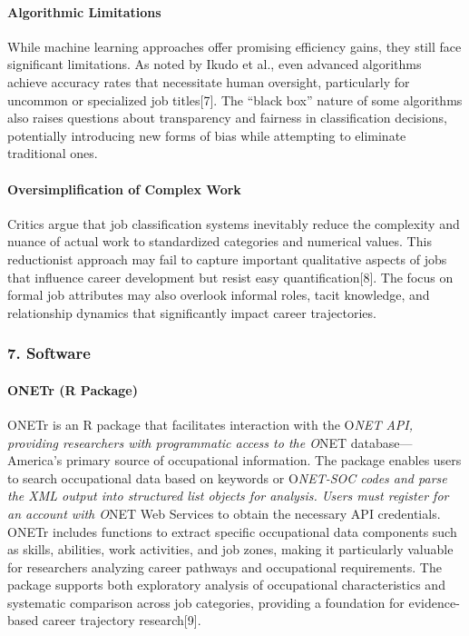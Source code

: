 \documentclass[./main.tex]{subfiles}
\begin{document}
\paragraph{Algorithmic Limitations}\label{algorithmic-limitations}

While machine learning approaches offer promising efficiency gains, they
still face significant limitations. As noted by Ikudo et al., even
advanced algorithms achieve accuracy rates that necessitate human
oversight, particularly for uncommon or specialized job titles{[}7{]}.
The ``black box'' nature of some algorithms also raises questions about
transparency and fairness in classification decisions, potentially
introducing new forms of bias while attempting to eliminate traditional
ones.

\paragraph{Oversimplification of Complex
Work}\label{oversimplification-of-complex-work}

Critics argue that job classification systems inevitably reduce the
complexity and nuance of actual work to standardized categories and
numerical values. This reductionist approach may fail to capture
important qualitative aspects of jobs that influence career development
but resist easy quantification{[}8{]}. The focus on formal job
attributes may also overlook informal roles, tacit knowledge, and
relationship dynamics that significantly impact career trajectories.

\subsubsection{7. Software}\label{software}

\paragraph{ONETr (R Package)}\label{onetr-r-package}

ONETr is an R package that facilitates interaction with the O\emph{NET
API, providing researchers with programmatic access to the O}NET
database---America's primary source of occupational information. The
package enables users to search occupational data based on keywords or
O\emph{NET-SOC codes and parse the XML output into structured list
objects for analysis. Users must register for an account with O}NET Web
Services to obtain the necessary API credentials. ONETr includes
functions to extract specific occupational data components such as
skills, abilities, work activities, and job zones, making it
particularly valuable for researchers analyzing career pathways and
occupational requirements. The package supports both exploratory
analysis of occupational characteristics and systematic comparison
across job categories, providing a foundation for evidence-based career
trajectory research{[}9{]}.
\end{document}
